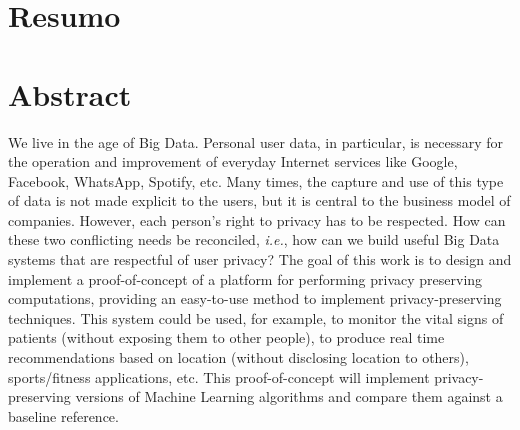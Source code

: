%

\chapter*{Resumo} %
\thispagestyle{empty}



\newpage

\chapter*{Abstract} %
\thispagestyle{empty}

We live in the age of Big Data. Personal user data, in particular, is necessary for the operation and improvement of everyday Internet services like Google, Facebook, WhatsApp, Spotify, etc. Many times, the capture and use of this type of data is not made explicit to the users, but it is central to the business model of companies. However, each person’s right to privacy has to be respected. How can these two conflicting needs be reconciled, \textit{i.e.}, how can we build useful Big Data systems that are respectful of user privacy?
The goal of this work is to design and implement a proof-of-concept of a platform for performing privacy preserving computations, providing an easy-to-use method to implement privacy-preserving techniques. This system could be used, for example, to monitor the vital signs of patients (without exposing them to other people), to produce real time recommendations based on location (without disclosing location to others), sports/fitness applications, etc.
This proof-of-concept will implement privacy-preserving versions of Machine Learning algorithms and compare them against a baseline reference.

\newpage
